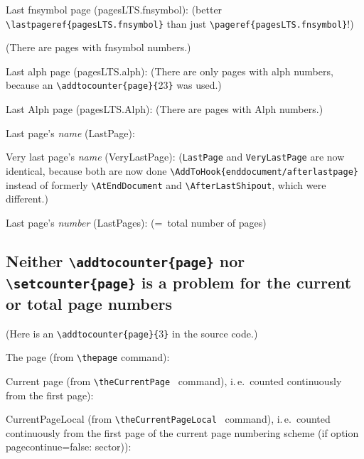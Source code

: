 \documentclass[british]{article}[2024/06/29]%
\def\pagesLTSexampleArabic{3}
\def\pagesLTSexamplealph{23}
\begin{document}
Last fnsymbol page (pagesLTS.fnsymbol): \newline
(better \verb|\lastpageref{pagesLTS.fnsymbol}| than just\newline
\verb|\pageref{pagesLTS.fnsymbol}|!)\bigskip

(There are  pages with fnsymbol numbers.)\bigskip

Last alph page (pagesLTS.alph): 
(There are only  pages with alph numbers,
because an \verb|\addtocounter{page}{|\pagesLTSexamplealph\verb|}| was used.)\bigskip

Last Alph page (pagesLTS.Alph): 
(There are  pages with Alph numbers.)\bigskip

Last page's \textit{name} (LastPage): \bigskip

Very last page's \textit{name} (VeryLastPage): \newline
(\texttt{LastPage} and \texttt{VeryLastPage} are now identical, because both are now done
\verb|\AddToHook{enddocument/afterlastpage}| instead of formerly\newline
\verb|\AtEndDocument| and \verb|\AfterLastShipout|, which were different.)\bigskip

Last page's \textit{number} (LastPages): 
(=~total number of pages)

\newpage
\subsection[addtocounter, setcounter]{Neither %
\texttt{\textbackslash addtocounter\{page\}} nor %
\texttt{\textbackslash setcounter\{page\}} is a problem for the %
current or total page numbers}

(Here is an \verb|\addtocounter{page}{|\pagesLTSexampleArabic\verb|}|
in the source code.)
\addtocounter{page}{\pagesLTSexampleArabic}\bigskip

The page (from \verb|\thepage| command): \thepage \bigskip

Current page (from \verb|\theCurrentPage|\ %
command), i.\,e.~counted continuously from the first page): \theCurrentPage \bigskip

CurrentPageLocal (from \verb|\theCurrentPageLocal|\ %
command), i.\,e.~counted continuously from the first page of the
current page numbering scheme (if option pagecontinue=false: sector)): \theCurrentPageLocal \bigskip
\end{document}
